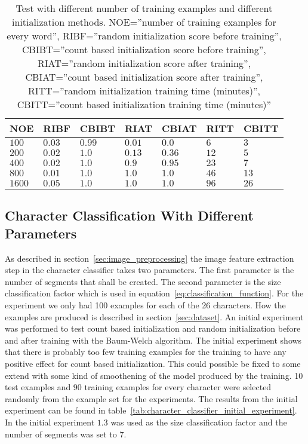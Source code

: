 \begin{table}[htb]
  \begin{center}
  \begin{tabular}{ l l l l l l l }
    NOE    & RIBF   & CBIBT  & RIAT    & CBIAT  & RITT & CBITT\\ \hline
    $100$  & $0.03$ & $0.99$ & $0.01$  & $0.0$  & $6$  & $3$\\ 
    $200$  & $0.02$ & $1.0$  & $0.13$  & $0.36$ & $12$ & $5$\\ 
    $400$  & $0.02$ & $1.0$  & $0.9$   & $0.95$ & $23$ & $7$\\
    $800$  & $0.01$ & $1.0$  & $1.0$   & $1.0$  & $46$ & $13$\\   
    $1600$ & $0.05$ & $1.0$  & $1.0$   & $1.0$  & $96$ & $26$\\  
  \end{tabular}
\end{center}
\caption{Test with different number of training examples and different initialization methods.
	 NOE=''number of training examples for every word'',
         RIBF=''random initialization score before training'',
         CBIBT=''count based initialization score before training'',
         RIAT=''random initialization score after training'',
         CBIAT=''count based initialization score after training'',
         RITT=''random initialization training time (minutes)'',
         CBITT=''count based initialization training time (minutes)''} 
\label{tab:word_classifier_results_generated_data} 
\end{table}

\subsection{Character Classification With Different Parameters}

As described in section~\ref{sec:image_preprocessing} the image feature extraction step in the character classifier takes two parameters.
The first parameter is the number of segments that shall be created. 
The second parameter is the size classification factor which is used in equation~\ref{eq:classification_function}. 
For the experiment we only had 100 examples for each of the 26 characters. 
How the examples are produced is described in section~\ref{sec:dataset}. 
An initial experiment was performed to test count based initialization and random initialization before and after training with the Baum-Welch algorithm.
The initial experiment shows that there is probably too few training examples for the training to have any positive effect for count based initialization. 
This could possible be fixed to some extend with some kind of smoothening of the model produced by the training. 
10 test examples and 90 training examples for every character were selected randomly from the example set for the experiments. 
The results from the initial experiment can be found in table~\ref{tab:character_classifier_initial_experiment}. 
In the initial experiment $1.3$ was used as the size classification factor and the number of segments was set to $7$.


